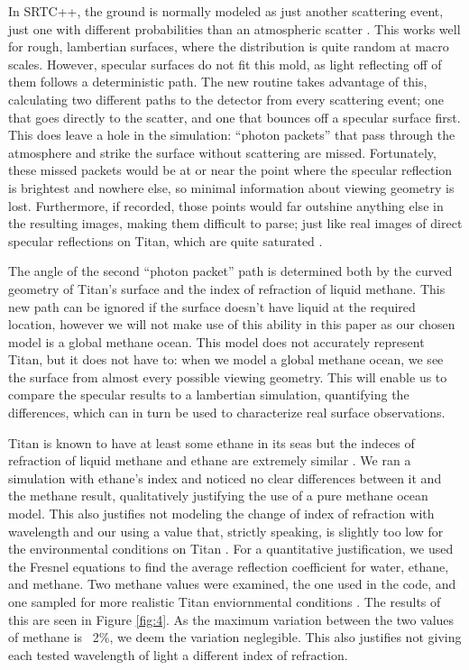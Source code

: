 \documentclass[twocolumn,linenumbers]{aastex631}
\begin{document}
In SRTC++, the ground is normally modeled as just another scattering event, just one with different probabilities than an atmospheric scatter \citep{Barnes2018}. This works well for rough, lambertian surfaces, where the distribution is quite random at macro scales. However, specular surfaces do not fit this mold, as light reflecting off of them follows a deterministic path.  The new routine takes advantage of this, calculating two different paths to the detector from every scattering event; one that goes directly to the scatter, and one that bounces off a specular surface first. This does leave a hole in the simulation: ``photon packets'' that pass through the atmosphere and strike the surface without scattering are missed. Fortunately, these missed packets would be at or near the point where the specular reflection is brightest and nowhere else, so minimal information about viewing geometry is lost. Furthermore, if recorded, those points would far outshine anything else in the resulting images, making them difficult to parse; just like real images of direct specular reflections on Titan, which are quite saturated \citep{Barnes2013}.

The angle of the second ``photon packet'' path is determined both by the curved geometry of Titan's surface and the index of refraction of liquid methane. This new path can be ignored if the surface doesn't have liquid at the required location, however we will not make use of this ability in this paper as our chosen model is a global methane ocean. This model does not accurately represent Titan, but it does not have to: when we model a global methane ocean, we see the surface from almost every possible viewing geometry. This will enable us to compare the specular results to a lambertian simulation, quantifying the differences, which can in turn be used to characterize real surface observations. 

Titan is known to have at least some ethane in its seas \citep{Mastrogiuseppe2016} but the indeces of refraction of liquid methane and ethane are extremely similar \citep{Kanjanasakul2020}. We ran a simulation with ethane's index and noticed no clear differences between it and the methane result, qualitatively justifying the use of a pure methane ocean model. This also justifies not modeling the change of index of refraction with wavelength and our using a value that, strictly speaking, is slightly too low for the environmental conditions on Titan \citep{Martonchik1994, Jennings2019}. For a quantitative justification, we used the Fresnel equations to find the average reflection coefficient for water, ethane, and methane. Two methane values were examined, the one used in the code, and one sampled for more realistic Titan enviornmental conditions \citep{Martonchik1994}. The results of this are seen in Figure \ref{fig:4}. As the maximum variation between the two values of methane is ~2\%, we deem the variation neglegible. This also justifies not giving each tested wavelength of light a different index of refraction.
\end{document}
